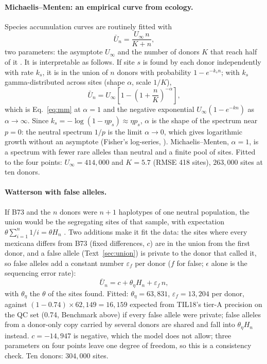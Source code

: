 \documentclass[11pt]{article}
\begin{document}
\paragraph{Michaelis--Menten: an empirical curve from ecology.} Species accumulation curves are routinely fitted with
\begin{equation}
\bar U_n=\frac{U_\infty\,n}{K+n},
\label{eq:mm}
\end{equation}
two parameters: the asymptote $U_\infty$ and the number of donors $K$ that reach half of it \citep{soberon1993accumulation}. It is
interpretable as follows. If site $s$ is found by each donor independently with rate $k_s$, it is in the union of $n$ donors with
probability $1-e^{-k_sn}$; with $k_s$ gamma-distributed across sites (shape $\alpha$, scale $1/K$),
\begin{equation}
\bar U_n=U_\infty\left[1-\left(1+\frac nK\right)^{-\alpha}\right],
\label{eq:gamma-accum}
\end{equation}
which is Eq.~\eqref{eq:mm} at $\alpha=1$ and the negative exponential $U_\infty(1-e^{-kn})$ as $\alpha\to\infty$. Since
$k_s=-\log(1-\eta p_s)\approx\eta p_s$, $\alpha$ is the shape of the spectrum near $p=0$: the neutral spectrum $1/p$ is the limit
$\alpha\to0$, which gives logarithmic growth without an asymptote (Fisher's log-series, \citealp{fisher1943}). Michaelis--Menten,
$\alpha=1$, is a spectrum with fewer rare alleles than neutral and a finite pool of sites. Fitted to the four points:
$U_\infty=414{,}000$ and $K=5.7$ (RMSE 418 sites), $263{,}000$ sites at ten donors.

\paragraph{Watterson with false alleles.} If B73 and the $n$ donors were $n+1$ haplotypes of one neutral population, the union would
be the segregating sites of that sample, with expectation $\theta\sum_{i=1}^{n}1/i=\theta H_n$ \citep{watterson1975}. Two additions
make it fit the data: the sites where every mexicana differs from B73 (fixed differences, $c$) are in the union from the first donor,
and a false allele (Text~\ref{sec:union}) is private to the donor that called it, so false alleles add a constant number $\varepsilon_f$
per donor ($f$ for false; $\epsilon$ alone is the sequencing error rate):
\begin{equation}
\bar U_n=c+\theta_\eta H_n+\varepsilon_f\,n,
\label{eq:watterson-false}
\end{equation}
with $\theta_\eta$ the $\theta$ of the sites found. Fitted: $\theta_\eta=63{,}831$, $\varepsilon_f=13{,}204$ per donor, against
$(1-0.74)\times62{,}149=16{,}159$ expected from TIL18's tier-A precision on the QC set (0.74, Benchmark above)
if every false allele were private; false alleles from a donor-only copy carried by several donors are shared and fall into
$\theta_\eta H_n$ instead. $c=-14{,}947$ is negative, which the model does not allow; three parameters on four points leave one
degree of freedom, so this is a consistency check. Ten donors: $304{,}000$ sites.
\end{document}
